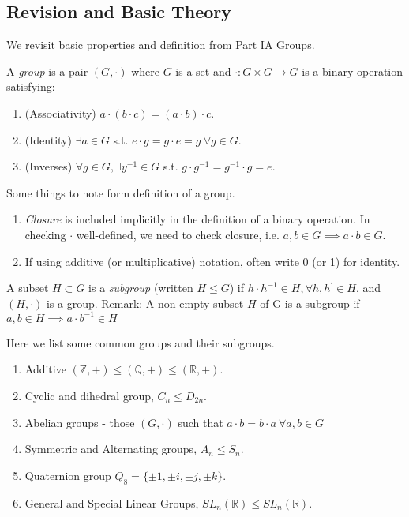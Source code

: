 \subsection{Revision and Basic Theory}
We revisit basic properties and definition from Part IA Groups.
\begin{definition}[Group]
    A \textit{group} is a pair \((G, \cdot)\) where \(G\) is a set and \(\cdot: G \times G \to G\) is a binary operation satisfying:
    \begin{enumerate}
        \item (Associativity) \(a \cdot (b \cdot c) = (a \cdot b) \cdot c \).
        \item (Identity) \(\exists a \in G\) s.t. \(e\cdot g = g \cdot e = g~\forall g \in G\).
        \item (Inverses) \(\forall g \in G, \exists y^{-1}\in G \) s.t. \( g\cdot g^{-1} = g^{-1}\cdot g = e\).
    \end{enumerate}
\end{definition}
\begin{remark}
    Some things to note form definition of a group.
    \begin{enumerate}
        \item \textit{Closure} is included implicitly in the definition of a binary operation. In checking \(\cdot\) well-defined, we need to check closure, i.e. \(a,b \in G \implies a\cdot b \in G\).
        \item If using additive (or multiplicative) notation, often write 0 (or 1) for identity.
    \end{enumerate}
\end{remark}

\begin{definition}[Subgroup]
A subset \(H \subset G\) is a \textit{subgroup} (written \(H \leq G\)) if \(h\cdot h^{-1}\in H, \forall h,h^\prime \in H\), and \((H, \cdot)\) is a group.
Remark: A non-empty subset \(H\) of G is a subgroup if \(a, b \in H \implies a\cdot b^{-1}\in H\) 
\end{definition}

\begin{example}
    Here we list some common groups and their subgroups.
    \begin{enumerate}
        \item Additive \((\mathbb{Z},+) \leq (\mathbb{Q},+) \leq (\mathbb{R},+)\).
        \item Cyclic and dihedral group, \(C_n \leq  D_{2n}\).
        \item Abelian groups - those \((G, \cdot)\) such that \(a \cdot b = b \cdot a~\forall a, b \in G\) 
        \item Symmetric and Alternating groups, \(A_n \leq  S_n\).
        \item Quaternion group \(Q_8 = \{\pm 1, \pm i, \pm j, \pm k\}\).
        \item General and Special Linear Groups, \(SL_n(\mathbb{R}) \leq  SL_n(\mathbb{R})\).
    \end{enumerate}
\end{example}

